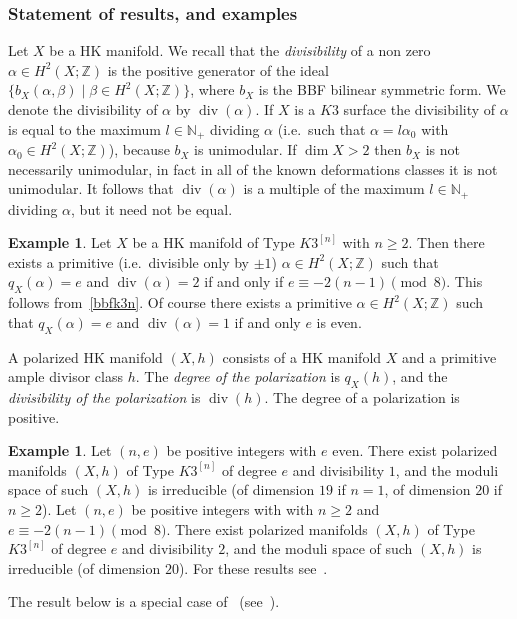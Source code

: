 \documentclass[11pt]{amsart}
\newcommand{\NN}{{\mathbb N}}
\newcommand{\ZZ}{{\mathbb Z}}
\DeclareMathOperator{\divisore}{div}
\theoremstyle{definition}
\newtheorem{expl}[lmm]{Example}
\theoremstyle{remark}
\begin{document}
\subsubsection{Statement of results, and examples}
%
Let $X$ be a HK manifold. We recall that the \emph{divisibility} of a non zero 
$\alpha\in H^2(X;\ZZ)$ is the positive generator of the ideal $\{b_X(\alpha,\beta)\mid \beta\in H^2(X;\ZZ)\}$, where $b_X$ is the BBF bilinear symmetric form. We denote the divisibility of 
$\alpha$ by $\divisore(\alpha)$.  If $X$ is a $K3$ surface  the divisibility of 
$\alpha$ is equal to the maximum $l\in\NN_{+}$ dividing $\alpha$ (i.e.~such that $\alpha=l\alpha_0$ with $\alpha_0\in H^2(X;\ZZ)$), because $b_X$ is unimodular. If $\dim X>2$ then $b_X$ is not necessarily unimodular, in fact in all of the known deformations classes it is not unimodular. It follows that 
$\divisore(\alpha)$ is a multiple of
 the maximum $l\in\NN_{+}$ dividing $\alpha$, but it need not be equal. 
\begin{expl}
%
 Let $X$ be a HK manifold of Type $K3^{[n]}$ with $n\ge 2$. Then there exists a primitive (i.e.~divisible only by $\pm 1$) $\alpha\in H^2(X;\ZZ)$ such that 
 $q_X(\alpha)=e$ and $\divisore(\alpha)=2$ if and only if $e\equiv -2(n-1)\pmod{8}$. This follows from~\eqref {bbfk3n}. Of course there exists a primitive  
 $\alpha\in H^2(X;\ZZ)$ such that 
 $q_X(\alpha)=e$  and $\divisore(\alpha)=1$ if and only $e$ is even.
\end{expl}
%
A polarized HK manifold $(X,h)$ consists of a  HK manifold $X$ and a   primitive ample divisor class $h$. The \emph{degree of the polarization} is $q_X(h)$,  
and the \emph{divisibility of the polarization} is $\divisore(h)$. The degree of a polarization is positive.
%
\begin{expl}
%
Let $(n,e)$ be positive integers  with 
$e$  even. There exist polarized manifolds  $(X,h)$ of Type $K3^{[n]}$ of degree $e$ and divisibility $1$, and the moduli space of such $(X,h)$ is irreducible (of dimension $19$ if $n=1$, of dimension $20$ if $n\ge 2$). 
Let $(n,e)$ be positive integers  with 
 with $n\ge 2$ and 
$e\equiv -2(n-1)\pmod{8}$. There exist polarized manifolds   $(X,h)$ of Type $K3^{[n]}$ of degree $e$ and divisibility $2$, and the moduli space of such 
$(X,h)$ is irreducible (of dimension  $20$). For these results see~\cite[Thm.~3.5]{debarre:hksurvey}.
%
\end{expl}
%
The result below is a special case of~\cite[Thm.~1.1]{og:fascik3n} (see~\cite[Subsubsect.~1.3.1]{og:fascik3n}).
%
\end{document}
